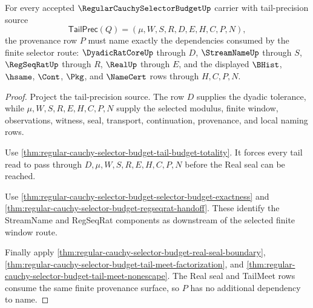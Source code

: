 \begin{theorem}
\label{thm:regular-cauchy-selector-budget-finite-window-provenance}
For every accepted $\RegularCauchySelectorBudgetUp$ carrier with tail-precision source
$$
\mathsf{TailPrec}(Q)=(\mu,W,S,R,D,E,H,C,P,N),
$$
the provenance row $P$ must name exactly the dependencies consumed by the finite selector route: $\DyadicRatCoreUp$ through $D$, $\StreamNameUp$ through $S$, $\RegSeqRatUp$ through $R$, $\RealUp$ through $E$, and the displayed $\BHist$, $\hsame$, $\Cont$, $\Pkg$, and $\NameCert$ rows through $H,C,P,N$.
\end{theorem}
\begin{proof}
Project the tail-precision source. The row $D$ supplies the dyadic tolerance, while $\mu,W,S,R,E,H,C,P,N$ supply the selected modulus, finite window, observations, witness, seal, transport, continuation, provenance, and local naming rows.

Use \autoref{thm:regular-cauchy-selector-budget-tail-budget-totality}. It forces every tail read to pass through $D,\mu,W,S,R,E,H,C,P,N$ before the Real seal can be reached.

Use \autoref{thm:regular-cauchy-selector-budget-selector-budget-exactness} and \autoref{thm:regular-cauchy-selector-budget-regseqrat-handoff}. These identify the StreamName and RegSeqRat components as downstream of the selected finite window route.

Finally apply \autoref{thm:regular-cauchy-selector-budget-real-seal-boundary}, \autoref{thm:regular-cauchy-selector-budget-tail-meet-factorization}, and \autoref{thm:regular-cauchy-selector-budget-tail-meet-nonescape}. The Real seal and TailMeet rows consume the same finite provenance surface, so $P$ has no additional dependency to name.
\end{proof}

